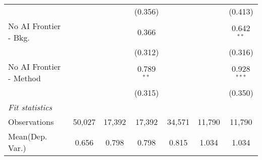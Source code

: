 \begin{tabular}{lcccccc}
                           &               &         & (0.356)      &         &         & (0.413)\\   
   No AI Frontier - Bkg.   &               &         & 0.366        &         &         & 0.642$^{**}$\\   
                           &               &         & (0.312)      &         &         & (0.316)\\   
   No AI Frontier - Method &               &         & 0.789$^{**}$ &         &         & 0.928$^{***}$\\   
                           &               &         & (0.315)      &         &         & (0.350)\\   
   \midrule
   \emph{Fit statistics}\\
   Observations            & 50,027        & 17,392  & 17,392       & 34,571  & 11,790  & 11,790\\  
Mean(Dep. Var.) & 0.656 & 0.798 & 0.798 & 0.815 & 1.034 & 1.034 \\
   

\end{tabular}
